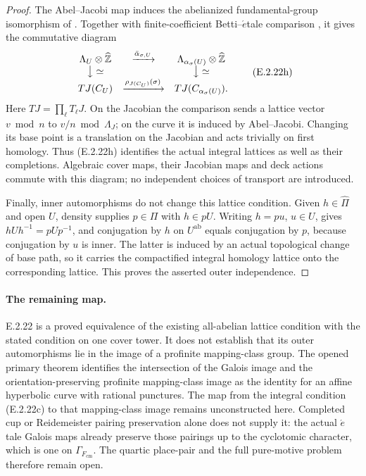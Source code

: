 \begin{proof}
The Abel--Jacobi map induces the abelianized fundamental-group
isomorphism of \cite[Proposition 9.1 and Corollary 9.6,
pp.30--32]{GenMilneJVs2021}. Together with finite-coefficient
Betti--\(\acute{e}\)tale comparison
\cite[Expos\'e XVI, Th\'eor\`eme 4.1]{GenSGA4}, it gives
the commutative diagram
\[
\begin{array}{ccc}
 \Lambda_U\otimes\widehat{\mathbb Z}
   &\xrightarrow{\bar\alpha_{\sigma,U}}&
 \Lambda_{\alpha_\sigma(U)}\otimes\widehat{\mathbb Z}\\
 \big\downarrow\simeq && \big\downarrow\simeq\\
 T J(C_U)&\xrightarrow{\rho_{J(C_U)}(\sigma)}&
 T J(C_{\alpha_\sigma(U)}).
\end{array}
 \tag{E.2.22h}
\]
Here \(TJ=\prod_\ell T_\ell J\). On the Jacobian the
comparison sends a lattice vector \(v\bmod n\) to
\(v/n\bmod\Lambda_J\); on the curve it is induced by
Abel--Jacobi. Changing its base point is a translation on
the Jacobian and acts trivially on first homology.
Thus (E.2.22h) identifies the actual integral lattices as
well as their completions. Algebraic cover maps, their
Jacobian maps and deck actions commute with this diagram;
no independent choices of transport are introduced.

Finally, inner automorphisms do not change this lattice
condition. Given \(h\in\widehat\Pi\) and open \(U\),
density supplies \(p\in\Pi\) with \(h\in pU\).
Writing \(h=pu\), \(u\in U\), gives
\(hUh^{-1}=pUp^{-1}\), and conjugation by \(h\) on
\(U^{\mathrm{ab}}\) equals conjugation by \(p\), because
conjugation by \(u\) is inner. The latter is induced by an
actual topological change of base path, so it carries the
compactified integral homology lattice onto the corresponding
lattice. This proves the asserted outer independence.
\end{proof}

\paragraph{The remaining map.}
E.2.22 is a proved equivalence of the existing all-abelian
lattice condition with the stated condition on one cover
tower. It does not establish that its outer automorphisms lie
in the image of a profinite mapping-class group.
The opened primary theorem
\cite[Theorem 1.1, p.2, proof p.3]{GenMatsumotoTamagawa1997}
identifies the intersection of the Galois image and the
orientation-preserving profinite mapping-class image as the
identity for an affine hyperbolic curve with rational
punctures. The map from the integral condition (E.2.22c) to
that mapping-class image remains unconstructed here.
Completed cup or Reidemeister pairing preservation alone
does not supply it: the actual \(\acute{e}\)tale Galois maps
already preserve those pairings up to the cyclotomic
character, which is one on \(\Gamma_{F_{\mathrm{cm}}}\).
The quartic place-pair and the full pure-motive problem
therefore remain open.

